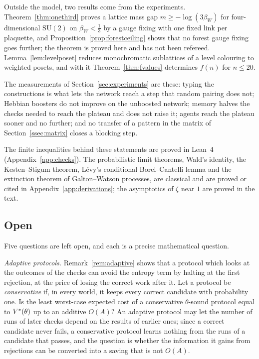 Outside the model, two results come from the experiments. Theorem~\ref{thm:onethird} proves a lattice mass gap $m\ge-\log(3\beta_{W})$ for four-dimensional $\mathrm{SU}(2)$ on $\beta_{W}<\frac13$ by a gauge fixing with one fixed link per plaquette, and Proposition~\ref{prop:forestceiling} shows that no forest gauge fixing goes further; the theorem is proved here and has not been refereed. Lemma~\ref{lem:levelposet} reduces monochromatic sublattices of a level colouring to weighted posets, and with it Theorem~\ref{thm:fvalues} determines $f(n)$ for $n\le20$.

The measurements of Section~\ref{sec:experiments} are these: typing the constructions is what lets the network reach a step that random pairing does not; Hebbian boosters do not improve on the unboosted network; memory halves the checks needed to reach the plateau and does not raise it; agents reach the plateau sooner and no further; and no transfer of a pattern in the matrix of Section~\ref{ssec:matrix} closes a blocking step.

The finite inequalities behind these statements are proved in Lean~4 (Appendix~\ref{app:checks}). The probabilistic limit theorems, Wald's identity, the Kesten--Stigum theorem, L\'evy's conditional Borel--Cantelli lemma and the extinction theorem of Galton--Watson processes, are classical and are proved or cited in Appendix~\ref{app:derivations}; the asymptotics of $\zeta$ near $1$ are proved in the text.

\subsection{Open}

Five questions are left open, and each is a precise mathematical question.

\emph{Adaptive protocols.} Remark~\ref{rem:adaptive} shows that a protocol which looks at the outcomes of the checks can avoid the entropy term by halting at the first rejection, at the price of losing the correct work after it. Let a protocol be \emph{conservative} if, in every world, it keeps every correct candidate with probability one. Is the least worst-case expected cost of a conservative $\theta$-sound protocol equal to $V^{*}(\theta)$ up to an additive $O(A)$? An adaptive protocol may let the number of runs of later checks depend on the results of earlier ones; since a correct candidate never fails, a conservative protocol learns nothing from the runs of a candidate that passes, and the question is whether the information it gains from rejections can be converted into a saving that is not $O(A)$.

